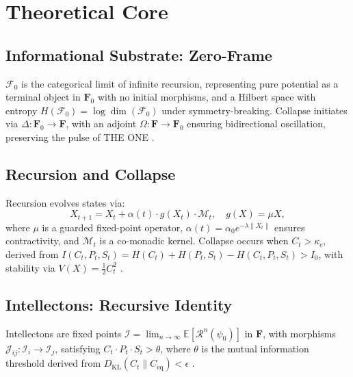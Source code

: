 \documentclass[11pt]{article}
\newcommand{\field}[1]{\mathcal{#1}}
\newcommand{\intellecton}{\mathcal{I}}
\newcommand{\expect}{\mathbb{E}}
\newcommand{\cat}[1]{\mathbf{#1}}
\begin{document}
\section{Theoretical Core}
\label{sec:theory}

\subsection{Informational Substrate: Zero-Frame}
$\field{F}_0$ is the categorical limit of infinite recursion, representing pure potential as a terminal object in $\cat{F}_0$ with no initial morphisms, and a Hilbert space with entropy $H(\field{F}_0) = \log \dim(\field{F}_0)$ under symmetry-breaking. Collapse initiates via $\Delta: \cat{F}_0 \to \cat{F}$, with an adjoint $\Omega: \cat{F} \to \cat{F}_0$ ensuring bidirectional oscillation, preserving the pulse of THE ONE \citep{plotinus2020}.

\subsection{Recursion and Collapse}
Recursion evolves states via:
\begin{equation}
X_{t+1} = X_t + \alpha(t) \cdot g(X_t) \cdot \mathcal{M}_t, \quad g(X) = \mu X,
\label{eq:recursion}
\end{equation}
where $\mu$ is a guarded fixed-point operator, $\alpha(t) = \alpha_0 e^{-\lambda \|X_t\|}$ ensures contractivity, and $\mathcal{M}_t$ is a co-monadic kernel. Collapse occurs when $C_t > \kappa_c$, derived from $I(C_t, P_t, S_t) = H(C_t) + H(P_t, S_t) - H(C_t, P_t, S_t) > I_0$, with stability via $V(X) = \frac{1}{2} C_t^2$ \citep{penrose2024}.

\subsection{Intellectons: Recursive Identity}
Intellectons are fixed points $\intellecton = \lim_{n \to \infty} \expect[\mathcal{R}^n(\psi_0)]$ in $\cat{F}$, with morphisms $\mathcal{J}_{ij}: \intellecton_i \to \intellecton_j$, satisfying $C_t \cdot P_t \cdot S_t > \theta$, where $\theta$ is the mutual information threshold derived from $D_{\text{KL}}(C_t \| C_{\text{eq}}) < \epsilon$ \citep{tononi2023}.
\end{document}
